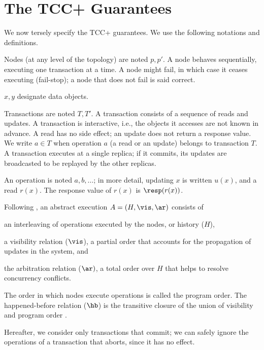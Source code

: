 \section{The TCC+ Guarantees}
\label{sec:tcc-guarantees}

We now tersely specify the TCC+ guarantees.
We use the following notations and definitions.
\begin{inparablank}
\item
  Nodes (at any level of the topology) are noted $p, p'$.
  A node behaves sequentially, executing one transaction at a time.
  A node might fail, in which case it ceases executing (fail-stop);
  a node that does not fail is said correct.
\item
  $x, y$ designate data objects.
\item
  Transactions are noted $T, T'$.
  A transaction consists of a sequence of reads and updates.
  A transaction is interactive, i.e., the objects it accesses are not
  known in advance.
  A read has no side effect; an update does not return a response value.
  We write $a \in T$ when operation $a$ (a read or an update) belongs to
  transaction $T$.
  A transaction executes at a single replica; if it commits, its updates
  are broadcasted to be replayed by the other replicas.
\item
  An operation is noted $a, b, \ldots{}$; in more detail, updating $x$
  is written $u(x)$, and a read $r(x)$.
  The response value of $r(x)$ is $\resp(r(x))$.
\end{inparablank}

Following \citet{rep:1754}, an abstract execution $A=(H,\vis,\ar)$
consists of
\begin{inparablank}
\item
  an interleaving of operations executed by the nodes, or history ($H$),
\item
  a visibility relation ($\vis$), a partial order that accounts
  for the propagation of updates in the system, and 
\item
  the arbitration relation ($\ar)$, a total order over $H$ that helps
  to resolve concurrency conflicts.
\end{inparablank}
%
The order in which nodes execute operations is called the program order.
The happened-before relation ($\hb$) is the transitive closure of the
union of visibility and program order \cite{rep:1754}.

Hereafter, we consider only transactions that commit; we can safely
ignore the operations of a transaction that aborts, since it has no
effect.

